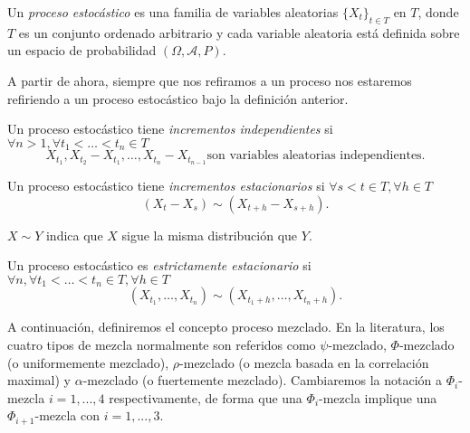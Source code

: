 \begin{itemize}
\begin{definicion}\label{def:pe}
  Un \emph{proceso estocástico} es una familia de variables aleatorias ${\{X_t\}}_{t \in T}$ en $T$, donde $T$ es un conjunto ordenado arbitrario y cada variable aleatoria está definida sobre un espacio de probabilidad $(\Omega, \mathscr{A}, P)$.
\end{definicion}

A partir de ahora, siempre que nos refiramos a un proceso nos estaremos refiriendo a un proceso estocástico bajo la definición anterior. \\

\begin{definicion}
  Un proceso estocástico tiene \emph{incrementos independientes} si $\forall n > 1, \forall t_1 < \ldots < t_n \in T$ $$X_{t_1}, X_{t_2} - X_{t_1}, \ldots, X_{t_n} - X_{t_{n-1}} \text{son variables aleatorias independientes.}$$
\end{definicion}

\begin{definicion}
  Un proceso estocástico tiene \emph{incrementos estacionarios} si $\forall s < t \in T, \forall h\in T$  $$(X_t - X_s) \sim (X_{t+h} - X_{s+h}).$$
\end{definicion}

\begin{nota}
  $X \sim Y$ indica que $X$ sigue la misma distribución que $Y$.
\end{nota}

\begin{definicion}
  Un proceso estocástico es \emph{estrictamente estacionario} si $\forall n, \forall t_1 < \ldots < t_n \in T, \forall h \in T$ $$(X_{t_1}, \ldots, X_{t_n}) \sim (X_{t_1 + h}, \ldots, X_{t_n + h}).$$
\end{definicion}

A continuación, definiremos el concepto proceso mezclado. En la literatura, los cuatro tipos de mezcla normalmente son referidos como $\psi$-mezclado, $\Phi$-mezclado (o uniformemente mezclado), $\rho$-mezclado (o mezcla basada en la correlación maximal) y $\alpha$-mezclado (o fuertemente mezclado). Cambiaremos la notación a $\Phi_i$-mezcla $i=1,...,4$ respectivamente, de forma que una $\Phi_i$-mezcla implique una $\Phi_{i+1}$-mezcla con $i=1,...,3$. \cite{RePEc:eee:spapps:v:36:y:1990:i:1:p:107-116}\\


\end{itemize}
